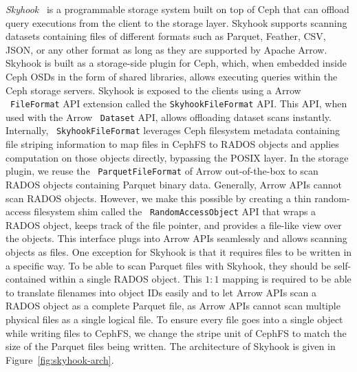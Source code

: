 \documentclass[11pt]{article}
\newcommand{\code}[1]{\colorbox{light-gray}{\texttt{#1}}}
\begin{document}
\textit{Skyhook}~\cite{jc2022skyhook} is a programmable storage system built on top of Ceph that can offload query executions from the client to the storage layer. Skyhook supports scanning datasets containing files of different formats such as Parquet, Feather, CSV, JSON, or any other format as long as they are supported by Apache Arrow. Skyhook is built as a storage-side plugin for Ceph, which, when embedded inside Ceph OSDs in the form of shared libraries, allows executing queries within the Ceph storage servers. Skyhook is exposed to the clients using a Arrow ~\code{FileFormat} API extension called the \code{SkyhookFileFormat} API. This API, when used with the Arrow ~\code{Dataset} API, allows offloading dataset scans instantly. Internally, ~\code{SkyhookFileFormat} leverages Ceph filesystem metadata containing file striping information to map files in CephFS to RADOS objects and applies computation on those objects directly, bypassing the POSIX layer. In the storage plugin, we reuse the ~\code{ParquetFileFormat} of Arrow out-of-the-box to scan RADOS objects containing Parquet binary data. Generally, Arrow APIs cannot scan RADOS objects. However, we make this possible by creating a thin random-access filesystem shim called the ~\code{RandomAccessObject} API that wraps a RADOS object, keeps track of the file pointer, and provides a file-like view over the objects. This interface plugs into Arrow APIs seamlessly and allows scanning objects as files. One exception for Skyhook is that it requires files to be written in a specific way. To be able to scan Parquet files with Skyhook, they should be self-contained within a single RADOS object. This $1:1$ mapping is required to be able to translate filenames into object IDs easily and to let Arrow APIs scan a RADOS object as a complete Parquet file, as Arrow APIs cannot scan multiple physical files as a single logical file. To ensure every file goes into a single object while writing files to CephFS, we change the stripe unit of CephFS to match the size of the Parquet files being written. The architecture of Skyhook is given in Figure~\ref{fig:skyhook-arch}.
\end{document}
